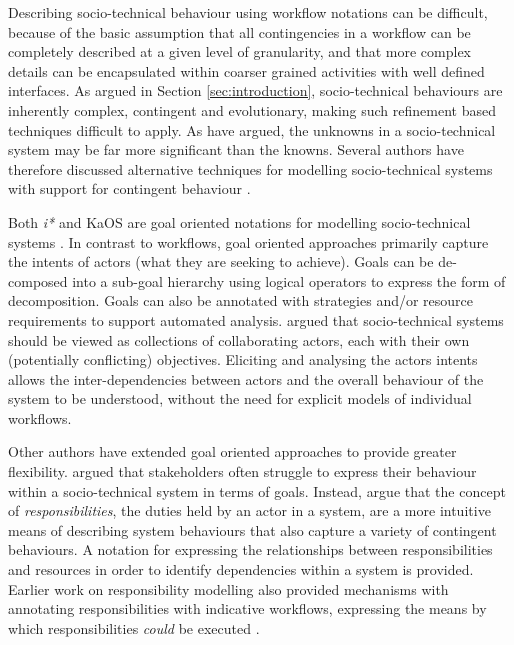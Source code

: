 \documentclass{sig-alternate}
\begin{document}

Describing socio-technical behaviour using workflow notations can be difficult, because of the basic assumption that all
contingencies in a workflow can be completely described at a given level of granularity, and that more complex details
can be encapsulated within coarser grained activities with well defined interfaces.  As argued in Section
\ref{sec:introduction}, socio-technical behaviours are inherently complex, contingent and evolutionary, making such
refinement based techniques difficult to apply.  As \citet{israilidis13ignorance} have argued, the unknowns in a
socio-technical system may be far more significant than the knowns. Several authors have therefore discussed alternative
techniques for modelling socio-technical systems with support for contingent behaviour
\citep{yu1995,dardenne93goal,Herrmann1999,sommerville09deriving}.

Both \emph{i*}\citet{yu1995} and KaOS \citet{dardenne93goal} are goal oriented notations for modelling socio-technical
systems \citep{Werneck2009}.  In contrast to workflows, goal oriented approaches primarily capture the intents of actors
(what they are seeking to achieve).  Goals can be de-composed into a sub-goal hierarchy using logical operators to
express the form of decomposition. Goals can also be annotated with strategies and/or resource requirements to support
automated analysis.  \citeauthor{yu1995} argued that socio-technical systems should be viewed as collections of
collaborating actors, each with their own (potentially conflicting) objectives.  Eliciting and analysing the actors
intents allows the inter-dependencies between actors and the overall behaviour of the system to be understood, without
the need for explicit models of individual workflows.

Other authors have extended goal oriented approaches to provide greater flexibility.  \citet{sommerville09deriving}
argued that stakeholders often struggle to express their behaviour within a socio-technical system in terms of goals.
Instead, \citeauthor{sommerville09deriving} argue that the concept of \emph{responsibilities}, the duties held by an
actor in a system, are a more intuitive means of describing system behaviours that also capture a variety of contingent
behaviours.  A notation for expressing the relationships between responsibilities and resources in order to identify
dependencies within a system is provided.  Earlier work on responsibility modelling also provided mechanisms with
annotating responsibilities with indicative workflows, expressing the means by which responsibilities \emph{could} be
executed \citep{dewsbury07responsibility}.
\end{document}
